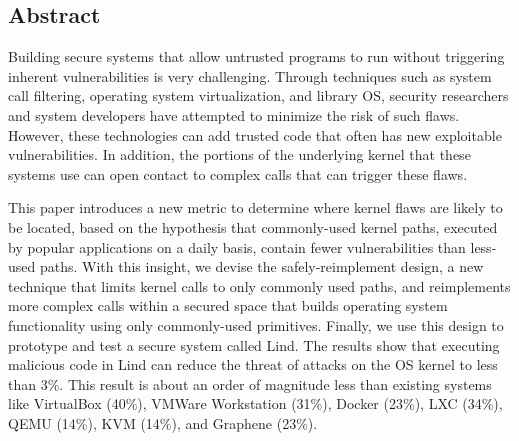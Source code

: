 \subsection*{Abstract}
Building secure systems that allow untrusted programs to run without
triggering inherent vulnerabilities %
is very challenging.
Through techniques such as system call filtering,
operating system virtualization, and library OS, security researchers
and system developers have attempted to minimize the risk of such flaws.
However, these technologies can add trusted code that often has new
exploitable vulnerabilities. In addition, the portions of the underlying kernel
that these systems use can open contact to complex calls that can trigger these
flaws.

This paper introduces a new metric to determine where kernel flaws are
likely to be located, based on the  hypothesis that commonly-used kernel
paths, executed by popular applications on a daily basis, contain fewer
vulnerabilities than less-used paths. With this insight, we devise the
safely-reimplement design, a new technique that limits kernel calls to only
commonly used paths, and reimplements more complex calls within a secured space
that builds operating system functionality
using only commonly-used primitives.
Finally, we use this design to prototype and test a secure system called Lind.
The results show that executing malicious code in Lind can reduce the threat
of attacks on the OS kernel to less than 3\%.
This result is about an order of magnitude less than existing systems like VirtualBox (40\%),
VMWare Workstation (31\%), Docker (23\%), LXC (34\%), QEMU (14\%), KVM (14\%), and Graphene (23\%).



